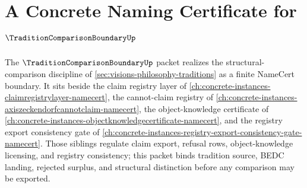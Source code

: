 \chapter{A Concrete Naming Certificate for $\TraditionComparisonBoundaryUp$}
\label{ch:concrete-instances-tradition-comparison-boundary-namecert}

The $\TraditionComparisonBoundaryUp$ packet realizes the structural-comparison discipline of \autoref{sec:visions-philosophy-traditions} as a finite NameCert boundary. It sits beside the claim registry layer of \autoref{ch:concrete-instances-claimregistrylayer-namecert}, the cannot-claim registry of \autoref{ch:concrete-instances-axiszeckendorfcannotclaim-namecert}, the object-knowledge certificate of \autoref{ch:concrete-instances-objectknowledgecertificate-namecert}, and the registry export consistency gate of \autoref{ch:concrete-instances-registry-export-consistency-gate-namecert}. Those siblings regulate claim export, refusal rows, object-knowledge licensing, and registry consistency; this packet binds tradition source, BEDC landing, rejected surplus, and structural distinction before any comparison may be exported.

